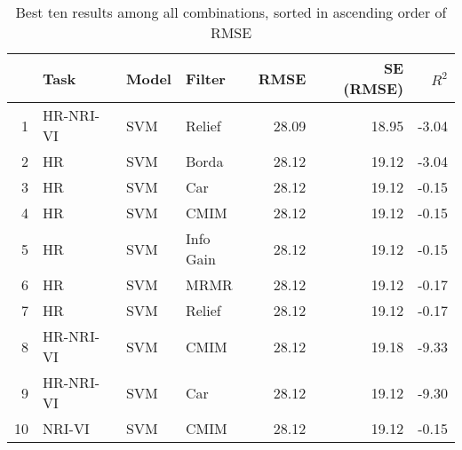 \begin{table}[ht!]
\centering
\caption{Best ten results among all combinations, sorted in ascending order of RMSE} 
\label{tab:perf-top-10}
\begin{tabular}{rlllrrr}
  \hline
 & Task & Model & Filter & RMSE & SE (RMSE) & $R^2$ \\ 
  \hline
1 & HR-NRI-VI & SVM & Relief & 28.09 & 18.95 & -3.04 \\ 
  2 & HR & SVM & Borda & 28.12 & 19.12 & -3.04 \\ 
  3 & HR & SVM & Car & 28.12 & 19.12 & -0.15 \\ 
  4 & HR & SVM & CMIM & 28.12 & 19.12 & -0.15 \\ 
  5 & HR & SVM & Info Gain & 28.12 & 19.12 & -0.15 \\ 
  6 & HR & SVM & MRMR & 28.12 & 19.12 & -0.17 \\ 
  7 & HR & SVM & Relief & 28.12 & 19.12 & -0.17 \\ 
  8 & HR-NRI-VI & SVM & CMIM & 28.12 & 19.18 & -9.33 \\ 
  9 & HR-NRI-VI & SVM & Car & 28.12 & 19.12 & -9.30 \\ 
  10 & NRI-VI & SVM & CMIM & 28.12 & 19.12 & -0.15 \\ 
   \hline
\end{tabular}
\end{table}
